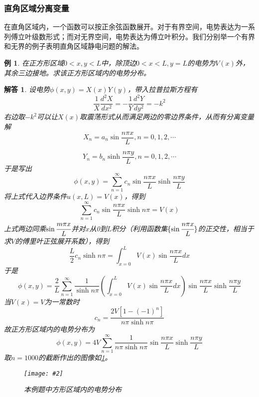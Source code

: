 \documentclass[a4paper,11pt]{ctexart}
\newcommand{\cpic}[2]{
\begin{center}
\texttt{[image: \#2]}
\end{center}
}
\newcommand{\cpicn}[3]
{
\begin{figure}[H]
\cpic{#1}{#2}
\caption{#3\label{#2}}
\end{figure}
}
\newtheorem{eg}{例}[section]
\newtheorem{ans}{解答}[section]
\newcommand{\beq}{\begin{equation}}
\newcommand{\eeq}{\end{equation}}
\begin{document}
\subsubsection{直角区域分离变量}
在直角区域内，一个函数可以按正余弦函数展开。对于有界空间，电势表达为一系列傅立叶级数形式；而对无界空间，电势表达为傅立叶积分。我们分别举一个有界和无界的例子表明直角区域静电问题的解法。\begin{eg}
在正方形区域$0<x,y<L$中，除顶边$0<x<L, y=L$的电势为$V(x)$外，其余三边接地。求该正方形区域内的电势分布。
\end{eg}
\begin{ans}
设电势$\phi( x,y) = X(x) Y(y)$，带入拉普拉斯方程有
\beq
\frac{1}{X} \frac{d^2 X}{d x^2} = - \frac{1}{Y} \frac{d^2 Y}{dy^2} = -k^2
\eeq
右边取$-k^2$可以让$X(x)$取震荡形式从而满足两边的零边界条件，从而有分离变量解
\begin{equation}
X_n = a_n \sin \frac{n\pi x}{L}, n=0,1,2,\cdots
\end{equation}

\begin{equation}
Y_n = b_n \sinh \frac{n\pi y}{L}, n=0,1,2,\cdots
\end{equation}
于是写出
\begin{equation}
\phi(x,y) = \sum_{n=1}^\infty c_n \sin \frac{n\pi x}{L} \sinh \frac{n\pi y}{L}
\end{equation}
将上式代入边界条件$u(x,L) =V(x)$，得到
\begin{equation}
\sum_{n=1}^\infty c_n \sin \frac{n\pi x}{L} \sinh n\pi = V(x)
\end{equation}
上式两边同乘$\sin \cfrac{m\pi x}{L}$并对$x$从0到$L$积分（利用函数集$\{ \sin \cfrac{n \pi x}{L}\}$的正交性，相当于求$V$的傅里叶正弦展开系数），得到
\beq
\frac{L}{2}  c_n \sinh n \pi=  \int_{x=0}^L V(x) \sin \frac{n \pi x}{L} dx
\eeq
于是
\beq
\phi(x,y) = \frac{2}{L} \sum_{n=1}^\infty \frac{1}{\sinh n \pi}  \left( \int_{x=0}^L V(x) \sin \frac{n \pi x}{L} dx \right)
\sin \frac{n\pi x}{L} \sinh \frac{n\pi y }{L}
\eeq
当$V(x)=V$为一常数时
\begin{equation}
c_n = \frac{2V[1-(-1)^n]}{n\pi \sinh n \pi} \end{equation}
故正方形区域内的电势分布为
\begin{equation}
\phi(x,y) = 4V\sum_{n=1}^{\infty} \frac{1}{n\pi \sinh n \pi}  \sin \frac{n\pi x}{L} \sinh \frac{n\pi y}{L}
\end{equation}
取$n=1000$的截断作出的图像如\cref{es2}。
\cpicn{0.4}{es2}{本例题中方形区域内的电势分布}
\end{ans}
\par
\end{document}
